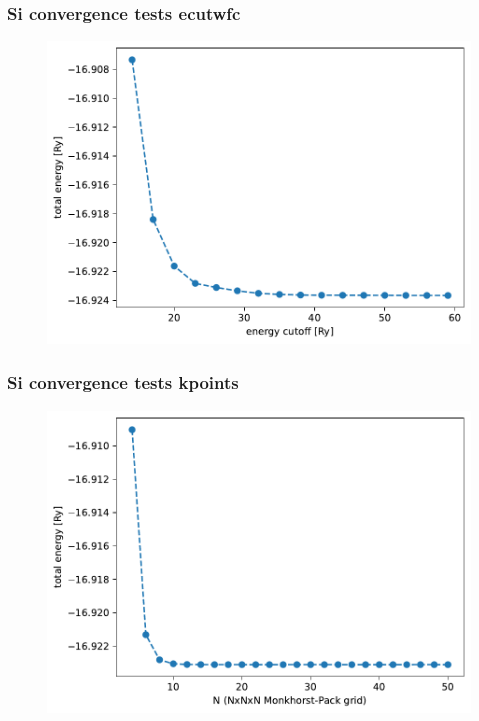 \documentclass{beamer}
\begin{document}
\begin{frame}
    \frametitle{Si convergence tests ecutwfc}
    \begin{figure}
        \includegraphics[width=\linewidth, height=\textheight,keepaspectratio]{si_ecutwfc.pdf}
    \end{figure}
\end{frame}

\begin{frame}
    \frametitle{Si convergence tests kpoints}
    \begin{figure}
        \includegraphics[width=\linewidth, height=\textheight,keepaspectratio]{si_kpoints.pdf}
    \end{figure}
\end{frame}
\end{document}
